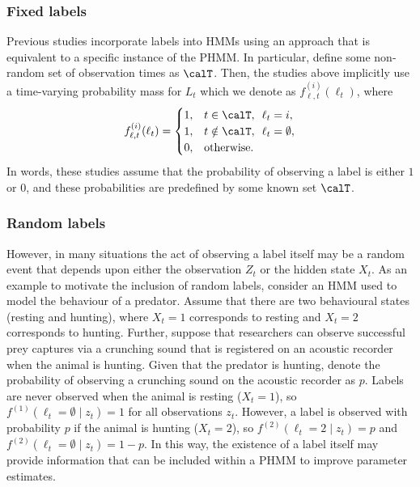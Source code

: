 
\subsubsection{Fixed labels}

Previous studies \citep{McClintock:2018,Li:2021} incorporate labels into HMMs using an approach that is equivalent to a specific instance of the PHMM. In particular, define some non-random set of observation times as $\calT$. Then, the studies above implicitly use a time-varying probability mass for $L_t$ which we denote as $f_{\ell,t}^{(i)}(\ell_t)$, where
%
\begin{gather}
    f_{\ell,t}^{(i)}(\ell_t) = \begin{cases} 1, & t \in \calT, \enspace \ell_t = i, \\ 
    1, & t \notin \calT, \enspace \ell_t = \emptyset, \\ 
    0, & \text{otherwise}. \end{cases} \label{eqn:PHMM_emis_niave}
\end{gather}
%
In words, these studies assume that the probability of observing a label is either $1$ or $0$, and these probabilities are predefined by some known set $\calT$.

\subsubsection{Random labels}

However, in many situations the act of observing a label itself may be a random event that depends upon either the observation $Z_t$ or the hidden state $X_t$. As an example to motivate the inclusion of random labels, consider an HMM used to model the behaviour of a predator. Assume that there are two behavioural states (resting and hunting), where $X_t = 1$ corresponds to resting and $X_t = 2$ corresponds to hunting. Further, suppose that researchers can observe successful prey captures via a crunching sound that is registered on an acoustic recorder when the animal is hunting. Given that the predator is hunting, denote the probability of observing a crunching sound on the acoustic recorder as $p$. Labels are never observed when the animal is resting ($X_t = 1$), so $f^{(1)}(\ell_t = \emptyset \mid z_t) = 1$ for all observations $z_t$. However, a label is observed with probability $p$ if the animal is hunting ($X_t = 2$), so $f^{(2)}(\ell_t = 2 \mid z_t) = p$ and $f^{(2)}(\ell_t = \emptyset \mid z_t) = 1-p$. In this way, the existence of a label itself may provide information that can be included within a PHMM to improve parameter estimates.

